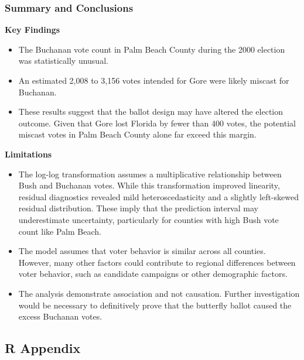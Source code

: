 \documentclass[
  letterpaper,
  DIV=11,
  numbers=noendperiod]{scrartcl}
\begin{document}
\subsubsection{Summary and Conclusions}\label{summary-and-conclusions}

\textbf{Key Findings}

\begin{itemize}
\item
  The Buchanan vote count in Palm Beach County during the 2000 election
  was statistically unusual.
\item
  An estimated 2,008 to 3,156 votes intended for Gore were likely
  miscast for Buchanan.
\item
  These results suggest that the ballot design may have altered the
  election outcome. Given that Gore lost Florida by fewer than 400
  votes, the potential miscast votes in Palm Beach County alone far
  exceed this margin.
\end{itemize}

\textbf{Limitations}

\begin{itemize}
\item
  The log-log transformation assumes a multiplicative relationship
  between Bush and Buchanan votes. While this transformation improved
  linearity, residual diagnostics revealed mild heteroscedasticity and a
  slightly left-skewed residual distribution. These imply that the
  prediction interval may underestimate uncertainty, particularly for
  counties with high Bush vote count like Palm Beach.
\item
  The model assumes that voter behavior is similar across all counties.
  However, many other factors could contribute to regional differences
  between voter behavior, such as candidate campaigns or other
  demographic factors.
\item
  The analysis demonstrate association and not causation. Further
  investigation would be necessary to definitively prove that the
  butterfly ballot caused the excess Buchanan votes.
\end{itemize}

\subsection{R Appendix}\label{r-appendix}
\end{document}
